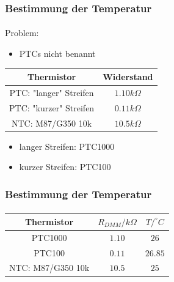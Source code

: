 \begin{frame}
    \frametitle{Bestimmung der Temperatur}
    \framesubtitle{}
    \begin{alertblock}{Problem:}
         \begin{itemize}
             \item PTCs nicht benannt
         \end{itemize}
    \end{alertblock}
    \pause
    \begin{center}
        \begin{tabular}{c|c}
            Thermistor & Widerstand \\
            \hline
            PTC: "langer" Streifen & $1.10k\Omega$\\
            PTC: "kurzer" Streifen & $0.11k\Omega$\\
            NTC: M87/G350 10k & $10.5k\Omega$
        \end{tabular}
    \end{center}
    \pause
    \begin{block}{}
        \begin{itemize}
            \item langer Streifen: PTC1000
            \item kurzer Streifen: PTC100
        \end{itemize}
    \end{block}
\end{frame}
\begin{frame}
    \frametitle{Bestimmung der Temperatur}
    \framesubtitle{}
    \begin{center}
        \begin{tabular}{c|c|c}
            Thermistor & $R_{DMM}/k\Omega$ & $T/^{\circ}C$\\
            \hline
            PTC1000 & $1.10$&$26$\\
            PTC100 & $0.11$&$26.85$ \\
            NTC: M87/G350 10k & $10.5$&$25$
        \end{tabular}
    \end{center}
\end{frame}
